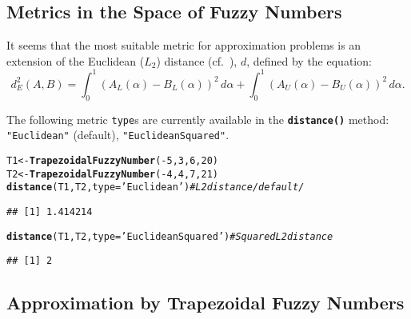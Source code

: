 \documentclass[11pt]{article}\usepackage[]{graphicx}\usepackage[]{color}
\makeatletter
\newcommand{\hlnum}[1]{\textcolor[rgb]{0.686,0.059,0.569}{#1}}%
\newcommand{\hlstr}[1]{\textcolor[rgb]{0.192,0.494,0.8}{#1}}%
\newcommand{\hlcom}[1]{\textcolor[rgb]{0.678,0.584,0.686}{\textit{#1}}}%
\newcommand{\hlopt}[1]{\textcolor[rgb]{0,0,0}{#1}}%
\newcommand{\hlstd}[1]{\textcolor[rgb]{0.345,0.345,0.345}{#1}}%
\newcommand{\hlkwb}[1]{\textcolor[rgb]{0.69,0.353,0.396}{#1}}%
\newcommand{\hlkwc}[1]{\textcolor[rgb]{0.333,0.667,0.333}{#1}}%
\newcommand{\hlkwd}[1]{\textcolor[rgb]{0.737,0.353,0.396}{\textbf{#1}}}%
\newenvironment{kframe}{%
 \def\at@end@of@kframe{}%
 \ifinner\ifhmode%
  \def\at@end@of@kframe{\end{minipage}}%
  \begin{minipage}{\columnwidth}%
 \fi\fi%
 \def\FrameCommand##1{\hskip\@totalleftmargin \hskip-\fboxsep
 \colorbox{shadecolor}{##1}\hskip-\fboxsep
     \hskip-\linewidth \hskip-\@totalleftmargin \hskip\columnwidth}%
 \MakeFramed {\advance\hsize-\width
   \@totalleftmargin\z@ \linewidth\hsize
   \@setminipage}}%
 {\par\unskip\endMakeFramed%
 \at@end@of@kframe}
\newenvironment{knitrout}{}{} %
\newcommand{\func}[1]{\texttt{\hlkwd{#1}}}
\newcommand{\argument}[1]{\texttt{\hlkwc{#1}}}
\newcommand{\str}[1]{\texttt{\hlstr{#1}}}
\makeatother
\begin{document}
\subsection{Metrics in the Space of Fuzzy Numbers}

It seems that the most suitable metric for approximation problems
is an extension of the Euclidean ($L_2$) distance
(cf.~\cite{Grzegorzewski1998:metricsordersfn}), $d$, defined by the equation:
\begin{equation}
d_E^2(A,B) = \int_0^1 \left(A_L(\alpha)-B_L(\alpha)\right)^2\,d\alpha
         + \int_0^1 \left(A_U(\alpha)-B_U(\alpha)\right)^2\,d\alpha.
\end{equation}


The following metric \argument{type}s are currently
available in the \func{distance()} method: \str{"{}Euclidean"{}} (default),
\str{"{}EuclideanSquared"{}}.

\begin{knitrout}\small
{}\color{fgcolor}\begin{kframe}
\begin{alltt}
\hlstd{T1} \hlkwb{<-} \hlkwd{TrapezoidalFuzzyNumber}\hlstd{(}\hlopt{-}\hlnum{5}\hlstd{,} \hlnum{3}\hlstd{,} \hlnum{6}\hlstd{,} \hlnum{20}\hlstd{)}
\hlstd{T2} \hlkwb{<-} \hlkwd{TrapezoidalFuzzyNumber}\hlstd{(}\hlopt{-}\hlnum{4}\hlstd{,} \hlnum{4}\hlstd{,} \hlnum{7}\hlstd{,} \hlnum{21}\hlstd{)}
\hlkwd{distance}\hlstd{(T1, T2,} \hlkwc{type}\hlstd{=}\hlstr{'Euclidean'}\hlstd{)} \hlcom{# L2 distance /default/}
\end{alltt}
\begin{verbatim}
## [1] 1.414214
\end{verbatim}
\begin{alltt}
\hlkwd{distance}\hlstd{(T1, T2,} \hlkwc{type}\hlstd{=}\hlstr{'EuclideanSquared'}\hlstd{)} \hlcom{# Squared L2 distance}
\end{alltt}
\begin{verbatim}
## [1] 2
\end{verbatim}
\end{kframe}
\end{knitrout}







\subsection{Approximation by Trapezoidal Fuzzy Numbers}
\end{document}
